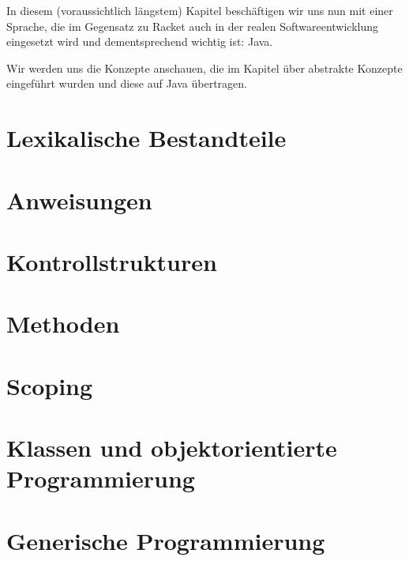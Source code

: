 In diesem (voraussichtlich längstem) Kapitel beschäftigen wir uns nun mit einer Sprache, die im Gegensatz zu Racket auch in der realen Softwareentwicklung eingesetzt wird und dementsprechend wichtig ist: Java.

Wir werden uns die Konzepte anschauen, die im Kapitel über abstrakte Konzepte eingeführt wurden und diese auf Java übertragen.

\section{Lexikalische Bestandteile}
	

\section{Anweisungen}
	

\section{Kontrollstrukturen}
	

\section{Methoden}
	

\section{Scoping}
	

\section{Klassen und objektorientierte Programmierung}
	

%	

\section{Generische Programmierung}
	

